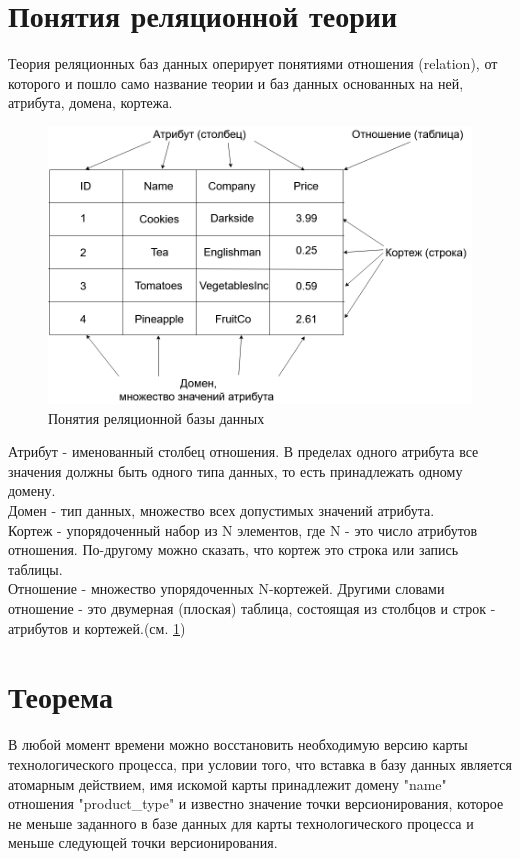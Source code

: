 \section{Понятия реляционной теории}
\indent Теория реляционных баз данных оперирует понятиями отношения (relation), от которого и пошло само название теории и баз данных основанных на ней, атрибута, домена, кортежа.

\begin{figure}[ht]
	\centering
	\includegraphics[width=\linewidth]{pics/databaseExample.png}
	\caption{Понятия реляционной базы данных}
	\label{fig:dbExample}
\end{figure}

\indent Атрибут - именованный столбец отношения.
В пределах одного атрибута все значения должны быть одного типа данных, то есть принадлежать одному домену.\\
\indent Домен - тип данных, множество всех допустимых значений атрибута.\\
\indent Кортеж - упорядоченный набор из N элементов, где N - это число атрибутов отношения.
По-другому можно сказать, что кортеж это строка или запись таблицы.\\
\indent Отношение - множество упорядоченных N-кортежей.
Другими словами отношение - это двумерная (плоская) таблица, состоящая из столбцов и строк - атрибутов и кортежей.(см. \ref{fig:dbExample})\\


\section{Теорема}
\begin{theorem}
	\label{th:th1}
	В любой момент времени можно восстановить необходимую версию карты технологического процесса, при условии того, что вставка в базу данных является атомарным действием, имя искомой карты принадлежит домену "name" отношения "product\_type" и известно значение точки версионирования, которое не меньше заданного в базе данных для карты технологического процесса и меньше следующей точки версионирования.
\end{theorem}

